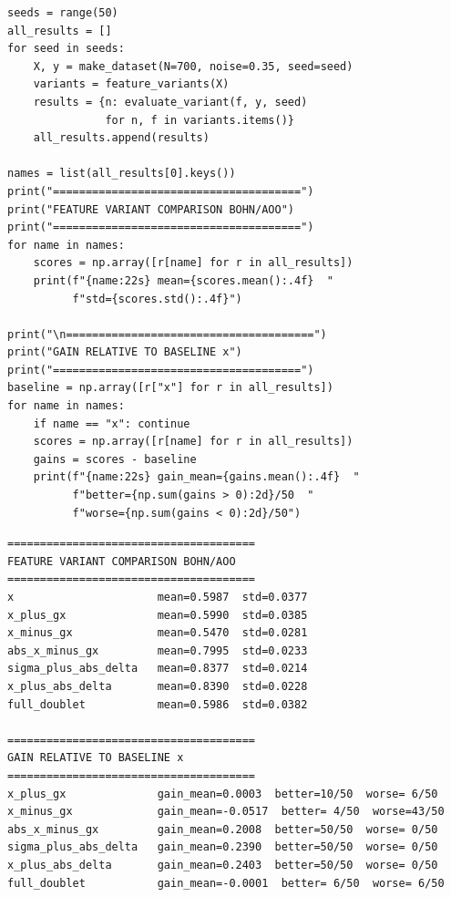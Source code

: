 \documentclass[11pt,a4paper]{report}
\begin{document}
\begin{lstlisting}[caption=SBOHN Experiment 5: feature variant comparison]
seeds = range(50)
all_results = []
for seed in seeds:
    X, y = make_dataset(N=700, noise=0.35, seed=seed)
    variants = feature_variants(X)
    results = {n: evaluate_variant(f, y, seed)
               for n, f in variants.items()}
    all_results.append(results)

names = list(all_results[0].keys())
print("======================================")
print("FEATURE VARIANT COMPARISON BOHN/AOO")
print("======================================")
for name in names:
    scores = np.array([r[name] for r in all_results])
    print(f"{name:22s} mean={scores.mean():.4f}  "
          f"std={scores.std():.4f}")

print("\n======================================")
print("GAIN RELATIVE TO BASELINE x")
print("======================================")
baseline = np.array([r["x"] for r in all_results])
for name in names:
    if name == "x": continue
    scores = np.array([r[name] for r in all_results])
    gains = scores - baseline
    print(f"{name:22s} gain_mean={gains.mean():.4f}  "
          f"better={np.sum(gains > 0):2d}/50  "
          f"worse={np.sum(gains < 0):2d}/50")
\end{lstlisting}

\label{app:ch3-lst10}
\begin{lstlisting}[style=textstyle, caption=Result of SBOHN-5 experiment]
======================================
FEATURE VARIANT COMPARISON BOHN/AOO
======================================
x                      mean=0.5987  std=0.0377
x_plus_gx              mean=0.5990  std=0.0385
x_minus_gx             mean=0.5470  std=0.0281
abs_x_minus_gx         mean=0.7995  std=0.0233
sigma_plus_abs_delta   mean=0.8377  std=0.0214
x_plus_abs_delta       mean=0.8390  std=0.0228
full_doublet           mean=0.5986  std=0.0382

======================================
GAIN RELATIVE TO BASELINE x
======================================
x_plus_gx              gain_mean=0.0003  better=10/50  worse= 6/50
x_minus_gx             gain_mean=-0.0517  better= 4/50  worse=43/50
abs_x_minus_gx         gain_mean=0.2008  better=50/50  worse= 0/50
sigma_plus_abs_delta   gain_mean=0.2390  better=50/50  worse= 0/50
x_plus_abs_delta       gain_mean=0.2403  better=50/50  worse= 0/50
full_doublet           gain_mean=-0.0001  better= 6/50  worse= 6/50
\end{lstlisting}
\end{document}
